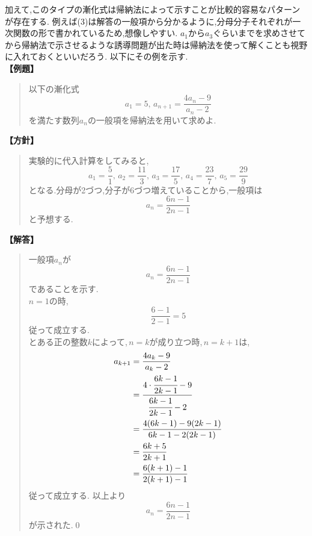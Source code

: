   加えて,このタイプの漸化式は帰納法によって示すことが比較的容易なパターンが存在する.
  例えば(3)は解答の一般項から分かるように,分母分子それぞれが一次関数の形で書かれているため,想像しやすい.
  $a_1$から$a_3$ぐらいまでを求めさせてから帰納法で示させるような誘導問題が出た時は帰納法を使って解くことも視野に入れておくといいだろう.
  以下にその例を示す.\\
    \noindent\textbf{【例題】}
    \begin{quote}
      以下の漸化式
      \[
        a_1=5,\, a_{n+1}=\dfrac{4a_{n}-9}{a_{n}-2}
      \]
      を満たす数列$a_n$の一般項を帰納法を用いて求めよ.
    \end{quote}
    \textbf{【方針】}
    \begin{quote}
      実験的に代入計算をしてみると,
      \[
        a_1=\frac{5}{1},\,a_2=\frac{11}{3},\,a_3=\frac{17}{5},\,a_4=\frac{23}{7},\,a_5=\frac{29}{9}
      \]
      となる.分母が2づつ,分子が6づつ増えていることから,一般項は
      \[
        a_n=\frac{6n-1}{2n-1}
      \]
      と予想する.
    \end{quote}
    \textbf{【解答】}
    \begin{quote}
      一般項$a_n$が
      \[
        a_n=\frac{6n-1}{2n-1}
      \]
      であることを示す.\\
      $n=1$の時,
      \[
        \frac{6-1}{2-1}=5
      \]
      従って成立する.\\
      とある正の整数$k$によって,\,$n=k$が成り立つ時,\,$n=k+1$は,
      \begin{align*}
        a_{k+1}&=\frac{4a_{k}-9}{a_{k}-2}\\
        &=\cfrac{4\cdot \cfrac{6k-1}{2k-1}-9}{\cfrac{6k-1}{2k-1}-2}\\
        &=\frac{4(6k-1)-9(2k-1)}{6k-1-2(2k-1)}\\
        &=\frac{6k+5}{2k+1}\\
        &=\frac{6(k+1)-1}{2(k+1)-1}
      \end{align*}
      従って成立する.
      以上より
      \[
        a_n=\frac{6n-1}{2n-1}
      \]
      が示された.\qed

  \end{quote}

